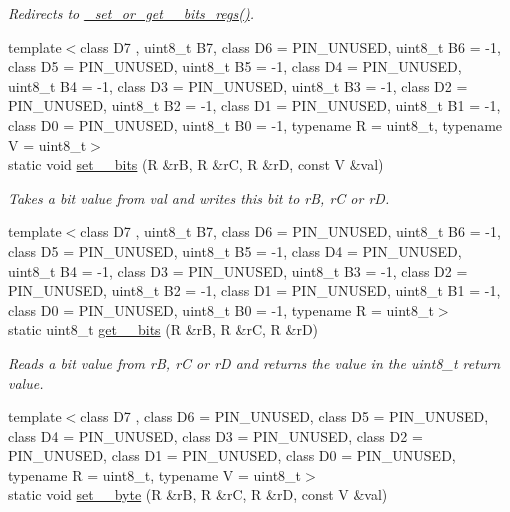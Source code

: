 \begin{DoxyCompactItemize}
\begin{DoxyCompactList}\small\item\em Redirects to \hyperlink{namespaceports_a541ed8a2807f6d65c80cdf90cd7106eb}{\+\_\+set\+\_\+or\+\_\+get\+\_\+\_\+bits\+\_\+regs()}. \end{DoxyCompactList}\item 
{\footnotesize template$<$class D7 , uint8\+\_\+t B7, class D6  = P\+I\+N\+\_\+\+U\+N\+U\+S\+ED, uint8\+\_\+t B6 = -\/1, class D5  = P\+I\+N\+\_\+\+U\+N\+U\+S\+ED, uint8\+\_\+t B5 = -\/1, class D4  = P\+I\+N\+\_\+\+U\+N\+U\+S\+ED, uint8\+\_\+t B4 = -\/1, class D3  = P\+I\+N\+\_\+\+U\+N\+U\+S\+ED, uint8\+\_\+t B3 = -\/1, class D2  = P\+I\+N\+\_\+\+U\+N\+U\+S\+ED, uint8\+\_\+t B2 = -\/1, class D1  = P\+I\+N\+\_\+\+U\+N\+U\+S\+ED, uint8\+\_\+t B1 = -\/1, class D0  = P\+I\+N\+\_\+\+U\+N\+U\+S\+ED, uint8\+\_\+t B0 = -\/1, typename R  = uint8\+\_\+t, typename V  = uint8\+\_\+t$>$ }\\static void \hyperlink{namespaceports_aac15fb87d8fede3f2bf8d764ab42965f}{set\+\_\+\_\+bits} (R \&rB, R \&rC, R \&rD, const V \&val)
\begin{DoxyCompactList}\small\item\em Takes a bit value from {\ttfamily val} and writes this bit to {\ttfamily rB}, {\ttfamily rC} or {\ttfamily rD}. \end{DoxyCompactList}\item 
{\footnotesize template$<$class D7 , uint8\+\_\+t B7, class D6  = P\+I\+N\+\_\+\+U\+N\+U\+S\+ED, uint8\+\_\+t B6 = -\/1, class D5  = P\+I\+N\+\_\+\+U\+N\+U\+S\+ED, uint8\+\_\+t B5 = -\/1, class D4  = P\+I\+N\+\_\+\+U\+N\+U\+S\+ED, uint8\+\_\+t B4 = -\/1, class D3  = P\+I\+N\+\_\+\+U\+N\+U\+S\+ED, uint8\+\_\+t B3 = -\/1, class D2  = P\+I\+N\+\_\+\+U\+N\+U\+S\+ED, uint8\+\_\+t B2 = -\/1, class D1  = P\+I\+N\+\_\+\+U\+N\+U\+S\+ED, uint8\+\_\+t B1 = -\/1, class D0  = P\+I\+N\+\_\+\+U\+N\+U\+S\+ED, uint8\+\_\+t B0 = -\/1, typename R  = uint8\+\_\+t$>$ }\\static uint8\+\_\+t \hyperlink{namespaceports_a9a1959ec95780c00a964b174a27b2a37}{get\+\_\+\_\+bits} (R \&rB, R \&rC, R \&rD)
\begin{DoxyCompactList}\small\item\em Reads a bit value from {\ttfamily rB}, {\ttfamily rC} or {\ttfamily rD} and returns the value in the {\ttfamily uint8\+\_\+t} return value. \end{DoxyCompactList}\item 
{\footnotesize template$<$class D7 , class D6  = P\+I\+N\+\_\+\+U\+N\+U\+S\+ED, class D5  = P\+I\+N\+\_\+\+U\+N\+U\+S\+ED, class D4  = P\+I\+N\+\_\+\+U\+N\+U\+S\+ED, class D3  = P\+I\+N\+\_\+\+U\+N\+U\+S\+ED, class D2  = P\+I\+N\+\_\+\+U\+N\+U\+S\+ED, class D1  = P\+I\+N\+\_\+\+U\+N\+U\+S\+ED, class D0  = P\+I\+N\+\_\+\+U\+N\+U\+S\+ED, typename R  = uint8\+\_\+t, typename V  = uint8\+\_\+t$>$ }\\static void \hyperlink{namespaceports_a7034c689dd509dc9c11ba8be46a26fd0}{set\+\_\+\_\+byte} (R \&rB, R \&rC, R \&rD, const V \&val)

\end{DoxyCompactItemize}
